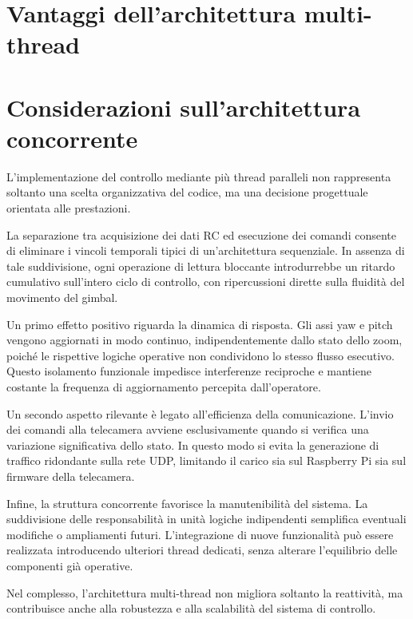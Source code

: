 \bigskip


\bigskip

\bigskip
\section*{Vantaggi dell’architettura multi-thread}

\bigskip

\section*{Considerazioni sull’architettura concorrente}

\bigskip

L’implementazione del controllo mediante più thread paralleli
non rappresenta soltanto una scelta organizzativa del codice,
ma una decisione progettuale orientata alle prestazioni.

La separazione tra acquisizione dei dati RC ed esecuzione dei comandi
consente di eliminare i vincoli temporali tipici di un’architettura sequenziale.
In assenza di tale suddivisione, ogni operazione di lettura bloccante
introdurrebbe un ritardo cumulativo sull’intero ciclo di controllo,
con ripercussioni dirette sulla fluidità del movimento del gimbal.

Un primo effetto positivo riguarda la dinamica di risposta.
Gli assi yaw e pitch vengono aggiornati in modo continuo,
indipendentemente dallo stato dello zoom,
poiché le rispettive logiche operative non condividono lo stesso flusso esecutivo.
Questo isolamento funzionale impedisce interferenze reciproche
e mantiene costante la frequenza di aggiornamento percepita dall’operatore.

Un secondo aspetto rilevante è legato all’efficienza della comunicazione.
L’invio dei comandi alla telecamera avviene esclusivamente
quando si verifica una variazione significativa dello stato.
In questo modo si evita la generazione di traffico ridondante sulla rete UDP,
limitando il carico sia sul Raspberry Pi sia sul firmware della telecamera.

Infine, la struttura concorrente favorisce la manutenibilità del sistema.
La suddivisione delle responsabilità in unità logiche indipendenti
semplifica eventuali modifiche o ampliamenti futuri.
L’integrazione di nuove funzionalità può essere realizzata
introducendo ulteriori thread dedicati,
senza alterare l’equilibrio delle componenti già operative.

Nel complesso, l’architettura multi-thread non migliora soltanto la reattività,
ma contribuisce anche alla robustezza e alla scalabilità del sistema di controllo.

